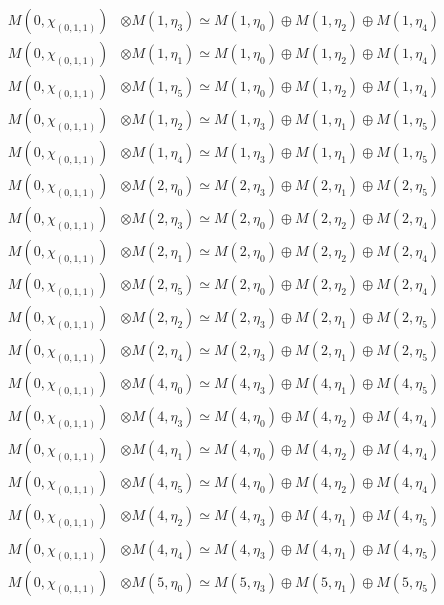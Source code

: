 \begin{align*}
M(0,\chi_{(0,1,1)}) &\otimes M(1,\eta_{3}) \simeq M(1,\eta_{0}) \oplus M(1,\eta_{2}) \oplus M(1,\eta_{4})\\
M(0,\chi_{(0,1,1)}) &\otimes M(1,\eta_{1}) \simeq M(1,\eta_{0}) \oplus M(1,\eta_{2}) \oplus M(1,\eta_{4})\\
M(0,\chi_{(0,1,1)}) &\otimes M(1,\eta_{5}) \simeq M(1,\eta_{0}) \oplus M(1,\eta_{2}) \oplus M(1,\eta_{4})\\
M(0,\chi_{(0,1,1)}) &\otimes M(1,\eta_{2}) \simeq M(1,\eta_{3}) \oplus M(1,\eta_{1}) \oplus M(1,\eta_{5})\\
M(0,\chi_{(0,1,1)}) &\otimes M(1,\eta_{4}) \simeq M(1,\eta_{3}) \oplus M(1,\eta_{1}) \oplus M(1,\eta_{5})\\
M(0,\chi_{(0,1,1)}) &\otimes M(2,\eta_{0}) \simeq M(2,\eta_{3}) \oplus M(2,\eta_{1}) \oplus M(2,\eta_{5})\\
M(0,\chi_{(0,1,1)}) &\otimes M(2,\eta_{3}) \simeq M(2,\eta_{0}) \oplus M(2,\eta_{2}) \oplus M(2,\eta_{4})\\
M(0,\chi_{(0,1,1)}) &\otimes M(2,\eta_{1}) \simeq M(2,\eta_{0}) \oplus M(2,\eta_{2}) \oplus M(2,\eta_{4})\\
M(0,\chi_{(0,1,1)}) &\otimes M(2,\eta_{5}) \simeq M(2,\eta_{0}) \oplus M(2,\eta_{2}) \oplus M(2,\eta_{4})\\
M(0,\chi_{(0,1,1)}) &\otimes M(2,\eta_{2}) \simeq M(2,\eta_{3}) \oplus M(2,\eta_{1}) \oplus M(2,\eta_{5})\\
M(0,\chi_{(0,1,1)}) &\otimes M(2,\eta_{4}) \simeq M(2,\eta_{3}) \oplus M(2,\eta_{1}) \oplus M(2,\eta_{5})\\
M(0,\chi_{(0,1,1)}) &\otimes M(4,\eta_{0}) \simeq M(4,\eta_{3}) \oplus M(4,\eta_{1}) \oplus M(4,\eta_{5})\\
M(0,\chi_{(0,1,1)}) &\otimes M(4,\eta_{3}) \simeq M(4,\eta_{0}) \oplus M(4,\eta_{2}) \oplus M(4,\eta_{4})\\
M(0,\chi_{(0,1,1)}) &\otimes M(4,\eta_{1}) \simeq M(4,\eta_{0}) \oplus M(4,\eta_{2}) \oplus M(4,\eta_{4})\\
M(0,\chi_{(0,1,1)}) &\otimes M(4,\eta_{5}) \simeq M(4,\eta_{0}) \oplus M(4,\eta_{2}) \oplus M(4,\eta_{4})\\
M(0,\chi_{(0,1,1)}) &\otimes M(4,\eta_{2}) \simeq M(4,\eta_{3}) \oplus M(4,\eta_{1}) \oplus M(4,\eta_{5})\\
M(0,\chi_{(0,1,1)}) &\otimes M(4,\eta_{4}) \simeq M(4,\eta_{3}) \oplus M(4,\eta_{1}) \oplus M(4,\eta_{5})\\
M(0,\chi_{(0,1,1)}) &\otimes M(5,\eta_{0}) \simeq M(5,\eta_{3}) \oplus M(5,\eta_{1}) \oplus M(5,\eta_{5})\\

\end{align*}
